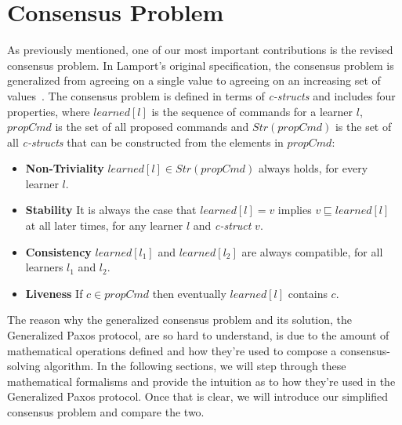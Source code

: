 \chapter{Consensus Problem}

As previously mentioned, one of our most important contributions is the revised consensus problem. In Lamport's original specification, the consensus problem is generalized from agreeing on a single value to agreeing on an increasing set of values~\cite{Lamport2005}. The consensus problem is defined in terms of \textit{c-structs} and includes four properties, where $learned[l]$ is the sequence of commands for a learner $l$, $propCmd$ is the set of all proposed commands and $Str(propCmd)$ is the set of all \textit{c-structs} that can be constructed from the elements in $propCmd$:
\begin{itemize}
	\item \textbf{Non-Triviality} $learned[l] \in Str(propCmd)$ always holds, for every learner $l$.
	\item \textbf{Stability} It is always the case that $learned[l] = v$ implies $v \sqsubseteq learned[l]$ at all later times, for any learner $l$ and \textit{c-struct} $v$.
	\item \textbf{Consistency} $learned[l_1]$ and $learned[l_2]$ are always compatible, for all learners $l_1$ and $l_2$.
	\item \textbf{Liveness} If $c \in propCmd$ then eventually $learned[l]$ contains $c$.
\end{itemize}

\par
The reason why the generalized consensus problem and its solution, the Generalized Paxos protocol, are so hard to understand, is due to the amount of mathematical operations defined and how they're used to compose a consensus-solving algorithm. In the following sections, we will step through these mathematical formalisms and provide the intuition as to how they're used in the Generalized Paxos protocol. Once that is clear, we will introduce our simplified consensus problem and compare the two.

